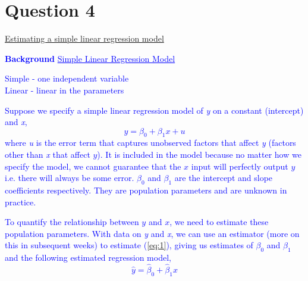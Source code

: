 \documentclass[12pt]{report}
\newenvironment{blueframed}[1][blue]
{\def\FrameCommand{\fboxsep=\FrameSep\fcolorbox{#1}{white}}%
	\MakeFramed {\advance\hsize-\width \FrameRestore}}
{\endMakeFramed}
\begin{document}
	\section*{Question 4}
	\underline{Estimating a simple linear regression model}
		
		\justify
		\begin{blueframed}
			\textcolor{blue}{\textbf{Background}}
			\vspace{-\baselineskip}
			\justify
			\textcolor{blue}{\underline{Simple Linear Regression Model}}
			
			\noindent \textcolor{blue}
			{
				\noindent Simple - one independent variable \\
				Linear - linear in the parameters
			}	
		
			\noindent \textcolor{blue}
			{
				\noindent Suppose we specify a simple linear regression model of \textit{y} on a constant (intercept) and \textit{x},
				\begin{equation}
					y = \beta_0 + \beta_1x + u \label{eq:1}
				\end{equation}
				where \textit{u} is the error term that captures unobserved factors that affect \textit{y} (factors other than \textit{x} that affect $y$). It is included in the model because no matter how we specify the model, we cannot guarantee that the $x$ input will perfectly output $y$ i.e. there will always be some error. $\beta_0$ and $\beta_1$ are the intercept and slope coefficients respectively. They are population parameters and are unknown in practice.
			}
		
		\noindent \textcolor{blue}
			{	
				\noindent To quantify the relationship between $y$ and $x$, we need to estimate these population parameters. With data on \textit{y} and \textit{x}, we can use an estimator (more on this in subsequent weeks) to estimate (\ref{eq:1}), giving us estimates of $\beta_0$ and $\beta_1$ and the following estimated regression model,
				\begin{equation}
					\hat{y} = \hat{\beta}_0 + \hat{\beta}_1x \label{eq:2}
				\end{equation}
			}
		\end{blueframed}
		
\end{document}
